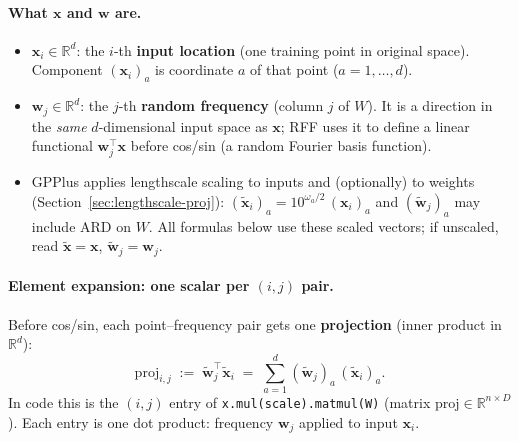 \documentclass[11pt]{article}
\begin{document}
\paragraph{What $\mathbf x$ and $\mathbf w$ are.}
\begin{itemize}
  \item $\mathbf x_i \in \mathbb{R}^d$: the $i$-th \textbf{input location} (one training point in original space).
        Component $(\mathbf x_i)_a$ is coordinate $a$ of that point ($a=1,\ldots,d$).
  \item $\mathbf w_j \in \mathbb{R}^d$: the $j$-th \textbf{random frequency} (column $j$ of $W$).
        It is a direction in the \emph{same} $d$-dimensional input space as $\mathbf x$; RFF uses it to define
        a linear functional $\mathbf w_j^{\top}\mathbf x$ before cos/sin (a random Fourier basis function).
  \item GPPlus applies lengthscale scaling to inputs and (optionally) to weights (Section~\ref{sec:lengthscale-proj}):
        $(\tilde{\mathbf x}_i)_a = 10^{\omega_a/2}\,(\mathbf x_i)_a$ and $(\tilde{\mathbf w}_j)_a$ may include ARD on $W$.
        All formulas below use these scaled vectors; if unscaled, read $\tilde{\mathbf x}=\mathbf x$, $\tilde{\mathbf w}_j=\mathbf w_j$.
\end{itemize}

\paragraph{Element expansion: one scalar per $(i,j)$ pair.}
Before cos/sin, each point--frequency pair gets one \textbf{projection} (inner product in $\mathbb{R}^d$):
\begin{equation}
  \label{eq:proj}
  \boxed{
  \mathrm{proj}_{i,j}
  \;:=\;
  \tilde{\mathbf w}_j^{\top}\tilde{\mathbf x}_i
  \;=\;
  \sum_{a=1}^{d} (\tilde{\mathbf w}_j)_a\,(\tilde{\mathbf x}_i)_a.
  }
\end{equation}
In code this is the $(i,j)$ entry of \texttt{x.mul(scale).matmul(W)} (matrix $\mathrm{proj}\in\mathbb{R}^{n\times D}$).
Each entry is one dot product: frequency $\mathbf w_j$ applied to input $\mathbf x_i$.
\end{document}
